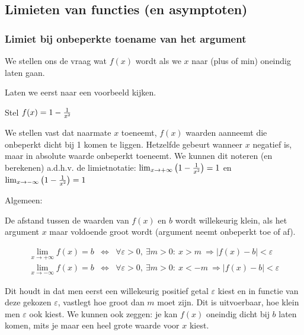 \subsection{Limieten van functies (en asymptoten)}


\subsubsection{Limiet bij onbeperkte toename van het argument}

We stellen ons de vraag wat $f(x)$ wordt als we $x$ naar (plus of
min) oneindig laten gaan.

Laten we eerst naar een voorbeeld kijken. 
\begin{voorbeeld}
Stel $f(x)= 1-\frac{1}{x\text{\texttwosuperior}}$

\begin{figure}[H]
	\centering
 
\end{figure}


We stellen vast dat naarmate $x$ toeneemt, $f(x)$ waarden
aanneemt die onbeperkt dicht bij 1 komen te liggen. Hetzelfde gebeurt
wanneer $x$ negatief is, maar in absolute waarde onbeperkt toeneemt.
We kunnen dit noteren (en berekenen) a.d.h.v. de limietnotatie: $\lim_{x\to+\infty}\left(1-\frac{1}{x\text{\texttwosuperior}}\right)=1$
en $\lim_{x\to-\infty}\left(1-\frac{1}{x\text{\texttwosuperior}}\right)=1$
\end{voorbeeld}

Algemeen:

De afstand tussen de waarden van $f(x)$ en $b$ wordt willekeurig
klein, als het argument $x$ maar voldoende groot wordt (argument
neemt onbeperkt toe of af).


\begin{eqnarray*}
 \lim_{x\to+\infty}f(x)=b & \Leftrightarrow & \forall\varepsilon>0,\:\exists m>0:\:x>m\:\Rightarrow\left|f(x)-b\right|<\varepsilon\\
 \lim_{x\to-\infty}f(x)=b & \Leftrightarrow & \forall\varepsilon>0,\:\exists m>0:\:x<-m\:\Rightarrow\left|f(x)-b\right|<\varepsilon
\end{eqnarray*}

Dit houdt in dat men eerst een willekeurig positief getal $\varepsilon$
kiest en in functie van deze gekozen $\varepsilon$, vastlegt hoe
groot dan $m$ moet zijn. Dit is uitvoerbaar, hoe klein men $\varepsilon$
ook kiest. We kunnen ook zeggen: je kan $f(x)$ oneindig dicht bij
$b$ laten komen, mits je maar een heel grote waarde voor $x$ kiest.

